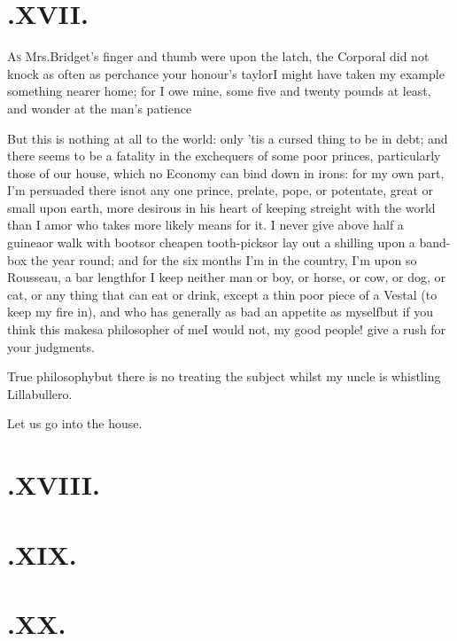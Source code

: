 \documentclass{article}
\begin{document}
\newpage
\section{.\enspace XVII.}

\lettrine{A}{s} Mrs.\@ Bridget’s finger
and thumb were upon the latch, the Corporal did not knock as often
as perchance your honour’s taylor\tsh I might have
taken my example something nearer home; for I owe mine, some five
and twenty pounds at least, and wonder at the man’s
patience\tsh

\tsh But this is nothing at all to the world: only ’tis a cursed thing to be in
debt; and there seems to be a fatality in the exchequers of some poor princes,
particularly those of our house, which no Economy can bind down in irons: for my own
part, I’m persuaded there is\pb not any one prince, prelate, pope, or potentate,
great or small upon earth, more desirous in his heart of keeping streight with the
world than I am\tsh or who takes more likely means for it. I never give above half
a guinea\tsh or walk with boots\tsh or cheapen tooth-picks\break\tsh or lay out a
shilling upon a band-\break box the year round; and for the six months I’m in the country,
I’m upon so 
Rousseau, a bar length\tsh for I keep neither man or boy, or horse, or cow, or dog,
or cat, or any thing that can eat or drink, except a thin poor piece of a Vestal (to
keep my fire in), and who has generally as bad an appetite as myself\tsh but if you
think this makes\pb a philosopher of me\tsh I would not, my good people! give a rush
for your judgments.

True philosophy\tsh but there is no treating the
subject whilst my uncle is whistling Lillabullero.

\tsh Let us go into the house.

\newpage
\section{.\enspace XVIII.}

\newpage
\section{.\enspace XIX.}

\newpage
\section{.\enspace XX.}
\end{document}
